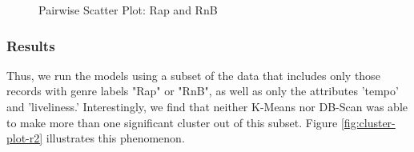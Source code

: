 \documentclass[conference]{IEEEtran}
\begin{document}
 \begin{figure}[!ht]
    \begin{center}
    \end{center}
    \caption{Pairwise Scatter Plot: Rap and RnB}
    \label{fig:pairwise-2}
\end{figure}

\subsubsection{Results}
Thus, we run the models using a subset of the data that includes only those records with genre labels "Rap" or "RnB", as well as only the attributes 'tempo' and 'liveliness.' Interestingly, we find that neither K-Means nor DB-Scan was able to make more than one significant cluster out of this subset. Figure \ref{fig:cluster-plot-r2} illustrates this phenomenon. 
\end{document}
